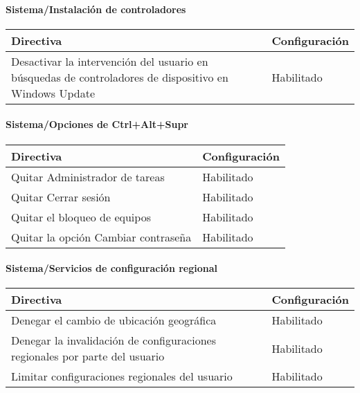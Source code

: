 \documentclass[
]{article}
\begin{document}
\hypertarget{sistemainstalaciuxf3n-de-controladores}{%
\paragraph{Sistema/Instalación de
controladores}\label{sistemainstalaciuxf3n-de-controladores}}

\begin{longtable}[]{@{}ll@{}}
\toprule
\textbf{Directiva} & \textbf{Configuración}\tabularnewline
\midrule
\endhead
Desactivar la intervención del usuario en búsquedas de controladores de
dispositivo en Windows Update & Habilitado\tabularnewline
\bottomrule
\end{longtable}

\hypertarget{sistemaopciones-de-ctrlaltsupr}{%
\paragraph{Sistema/Opciones de
Ctrl+Alt+Supr}\label{sistemaopciones-de-ctrlaltsupr}}

\begin{longtable}[]{@{}ll@{}}
\toprule
\textbf{Directiva} & \textbf{Configuración}\tabularnewline
\midrule
\endhead
Quitar Administrador de tareas & Habilitado\tabularnewline
Quitar Cerrar sesión & Habilitado\tabularnewline
Quitar el bloqueo de equipos & Habilitado\tabularnewline
Quitar la opción Cambiar contraseña & Habilitado\tabularnewline
\bottomrule
\end{longtable}

\hypertarget{sistemaservicios-de-configuraciuxf3n-regional-1}{%
\paragraph{Sistema/Servicios de configuración
regional}\label{sistemaservicios-de-configuraciuxf3n-regional-1}}

\begin{longtable}[]{@{}ll@{}}
\toprule
\textbf{Directiva} & \textbf{Configuración}\tabularnewline
\midrule
\endhead
Denegar el cambio de ubicación geográfica & Habilitado\tabularnewline
Denegar la invalidación de configuraciones regionales por parte del
usuario & Habilitado\tabularnewline
Limitar configuraciones regionales del usuario &
Habilitado\tabularnewline
\bottomrule
\end{longtable}

\hypertarget{section-18}{%
\subsubsection{}\label{section-18}}
\end{document}
